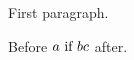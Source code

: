 \documentclass{article}
\begin{document}
First paragraph.

Before $a \text{ if } b  c$ after.
\end{document}

